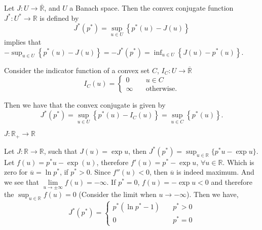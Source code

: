 \begin{definition}[Duality]
Let $J:U\rightarrow \overline{\mathbb{R}}$, and $U$ a Banach space. Then the convex conjugate function $J^*: U^* \rightarrow \mathbb{R}$ is defined by
\[
	J^*(p^*)=\sup_{u\in U} \left\lbrace p^*(u)-J(u)\right\rbrace
\]
implies that $-\sup_{u\in U} \left\lbrace p^*(u)-J(u) \right\rbrace= -J^*(p^*)= \inf_{u\in U} \left\lbrace J(u)-p^*(u)\right\rbrace$.
\end{definition}

\begin{example}
	Consider the indicator function of a convex set $C$, $I_C: U\rightarrow\overline{\mathbb{R}}$
	\[
	I_C(u)=
	\left\lbrace
	\begin{array}{cl}
	0&\quad u \in C\\
	\infty & \quad \text{otherwise}.
	\end{array}
	\right.
	\]
	
	Then we have that the convex conjugate is given by
	\[J^*(p^*)=\sup_{u\in U}\left\lbrace p^*(u)-I_C(u)\right\rbrace=\sup_{u\in C}\left\lbrace p^*(u)\right\rbrace.\]
\end{example}
\begin{example}
	$J: \mathbb{R}_+\rightarrow \mathbb{R}$
\end{example}
\begin{example}
	Let $J:\mathbb{R}\rightarrow \mathbb{R}$, such that $J(u)=\exp u$, then $J^*(p^*)=\sup_{u\in \mathbb{R}} \lbrace p^*u -\exp u\rbrace$. Let $f(u)=p^*u-\exp(u)$, therefore $f'(u)=p^*-\exp u$, $\forall u \in \mathbb{R}$. Which is zero for $\overline{u} = \ln p^*$, if $p^*>0$. Since $f''(u)<0$, then $\overline{u}$ is indeed maximum. And we see that $\lim\limits_{u\rightarrow \pm \infty} f(u)=-\infty$. If $p^*=0$, $f(u)=-\exp u < 0$ and therefore the $\sup_{u \in \mathbb{R}} f(u)=0$ (Consider the limit when $u \rightarrow -\infty$). Then we have,
	\begin{equation*}
		J^*(p^*)=\left\lbrace 
		\begin{array}{cr}
			p^*(\ln p^*-1) & \quad p^*>0 \\
			0 & \quad p^*=0
		\end{array}		
		\right.
	\end{equation*}	
\end{example}
